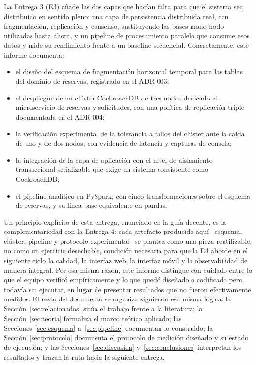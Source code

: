 \documentclass[10pt,twocolumn]{article}
\begin{document}
La Entrega 3 (E3) añade las dos capas que hacían falta para que el sistema
sea distribuido en sentido pleno: una capa de persistencia distribuida real,
con fragmentación, replicación y consenso, sustituyendo las bases mono-nodo
utilizadas hasta ahora, y un pipeline de procesamiento paralelo que
consume esos datos y mide su rendimiento frente a un baseline secuencial.
Concretamente, este informe documenta:

\begin{itemize}[leftmargin=*,itemsep=2pt]
  \item el diseño del esquema de fragmentación horizontal temporal para las
  tablas del dominio de reservas, registrado en el ADR-003;
  \item el despliegue de un clúster CockroachDB de tres nodos dedicado al
  microservicio de reservas y solicitudes, con una política de replicación
  triple documentada en el ADR-004;
  \item la verificación experimental de la tolerancia a fallos del clúster
  ante la caída de uno y de dos nodos, con evidencia de latencia y capturas
  de consola;
  \item la integración de la capa de aplicación con el nivel de
  aislamiento transaccional serializable que exige un sistema
  consistente como CockroachDB;
  \item el pipeline analítico en PySpark, con cinco transformaciones sobre
  el esquema de reservas, y su línea base equivalente en pandas.
\end{itemize}

Un principio explícito de esta entrega, enunciado en la guía docente, es
la complementariedad con la Entrega 4: cada artefacto producido aquí
--esquema, clúster, pipeline y protocolo experimental-- se plantea como
una pieza reutilizable, no como un ejercicio desechable, condición
necesaria para que la E4 aborde en el siguiente ciclo la calidad, la
interfaz web, la interfaz móvil y la observabilidad de manera integral.
Por esa misma razón, este informe distingue con
cuidado entre lo que el equipo verificó empíricamente y lo que quedó
diseñado o codificado pero todavía sin ejecutar, en lugar de presentar
resultados que no fueron efectivamente medidos. El resto del documento se
organiza siguiendo esa misma lógica: la Sección~\ref{sec:relacionados}
sitúa el trabajo frente a la literatura; la
Sección~\ref{sec:teoria} formaliza el marco teórico aplicado; las
Secciones~\ref{sec:esquema} a~\ref{sec:pipeline} documentan lo construido;
la Sección~\ref{sec:protocolo} documenta el protocolo de medición diseñado
y su estado de ejecución; y las
Secciones~\ref{sec:discusion} y~\ref{sec:conclusiones} interpretan los
resultados y trazan la ruta hacia la siguiente entrega.
\end{document}
